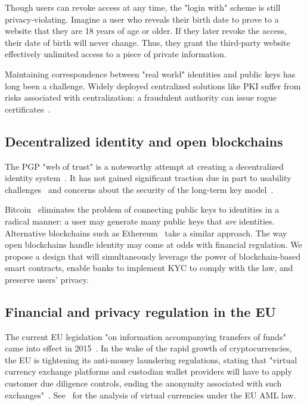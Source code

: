 Though users can revoke access at any time, the "login with" scheme is still privacy-violating.
Imagine a user who reveals their birth date to prove to a website that they are 18 years of age or older.
If they later revoke the access, their date of birth will never change.
Thus, they grant the third-party website effectively unlimited access to a piece of private information.

Maintaining correspondence between "real world" identities and public keys has long been a challenge.
Widely deployed centralized solutions like PKI suffer from risks associated with centralization: a fraudulent authority can issue rogue certificates~\cite{Amann2017}.


\subsection{Decentralized identity and open blockchains}

The PGP "web of trust" is a noteworthy attempt at creating a decentralized identity system~\cite{Feisthammel2017}.
It has not gained significant traction due in part to usability challenges~\cite{Ruoti2015} and concerns about the security of the long-term key model~\cite{Valsorda2016}.

Bitcoin~\cite{Nakamoto2008} eliminates the problem of connecting public keys to identities in a radical manner: a user may generate many public keys that \textit{are} identities.
Alternative blockchains such as Ethereum~\cite{Buterin2014, Wood2014} take a similar approach.
The way open blockchains handle identity may come at odds with financial regulation.
We propose a design that will simultaneously leverage the power of blockchain-based smart contracts, enable banks to implement KYC to comply with the law, and preserve users' privacy.


\subsection{Financial and privacy regulation in the EU} \label{sec:Ch12KYCEU}

The current EU legislation "on information accompanying transfers of funds" came into effect in 2015~\cite{EU847}.
In the wake of the rapid growth of cryptocurrencies, the EU is tightening its anti-money laundering regulations, stating that "virtual currency exchange platforms and custodian wallet providers will have to apply customer due diligence controls, ending the anonymity associated with such exchanges"~\cite{EU16}.
See~\cite{Vandezande2017} for the analysis of virtual currencies under the EU AML law.

